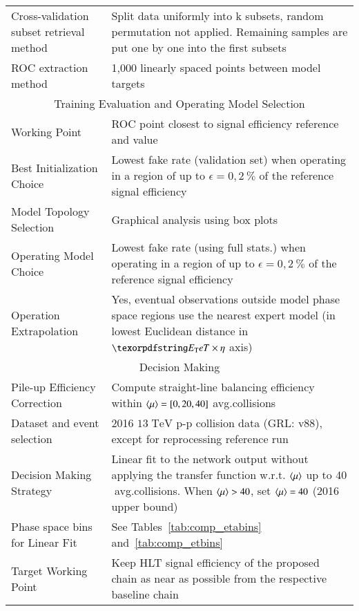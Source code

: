 \begin{table}[ht!]
{\begin{tabular}{p{6cm}p{10cm}}
Cross-validation subset retrieval method & Split data uniformly into k subsets,
random permutation not applied. Remaining samples are put one by one into the
first subsets \\
ROC extraction method & 1,000 linearly spaced points between model targets \\
\hline
\hline
\multicolumn{2}{c}{Training Evaluation and Operating Model Selection } \\
\hline
\hline

Working Point & ROC point closest to signal efficiency reference and \spmax{}
value \\

Best Initialization Choice & Lowest fake rate (validation set) when operating in
a region of up to $\epsilon=0,2~\%$ of the reference signal efficiency \\

Model Topology Selection & Graphical analysis using box plots \\

Operating Model Choice & Lowest fake rate (using full stats.) when operating in
a region of up to $\epsilon=0,2~\%$ of the reference signal efficiency \\

Operation Extrapolation & Yes, eventual observations outside model phase
space regions use the nearest expert model (in lowest Euclidean
distance in $\et\times\eta$ axis) \\

\hline
\hline
\multicolumn{2}{c}{Decision Making} \\
\hline
\hline

Pile-up Efficiency Correction & Compute straight-line balancing efficiency within
$\langle \mu \rangle=[0,20,40]$ avg.\@ collisions \\
Dataset and event selection & 2016 $13\;\text{TeV}$ p-p collision data
(GRL: v88), except for reprocessing reference run \\
Decision Making Strategy & Linear fit to the network output without applying the
transfer function w.r.t. $\langle \mu \rangle$ up to 40$\;$avg.\@ collisions.
When $\langle \mu \rangle>40$, set $\langle \mu \rangle = 40$ (2016 upper bound) \\

Phase space bins for Linear Fit & See
Tables~\ref{tab:comp_etabins} and~\ref{tab:comp_etbins} \\
Target Working Point & Keep HLT signal efficiency of the proposed chain as near
as possible from the respective baseline chain \\
\hline
\hline
\hline
\end{tabular}
}
\end{table}



